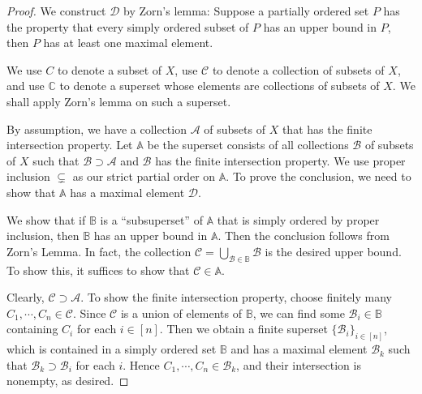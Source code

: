 \documentclass{article}
\numberwithin{equation}{section}
\theoremstyle{plain}
\theoremstyle{definition}
\begin{document}
\begin{proof}
We construct $\mathscr{D}$ by Zorn's lemma: Suppose a partially ordered set $P$ has the property that every simply ordered subset of $P$ has an upper bound in $P$, then $P$ has at least one maximal element.

We use $C$ to denote a subset of $X$, use $\mathscr{C}$ to denote a collection of subsets of $X$, and use $\mathbb{C}$ to denote a superset whose elements are collections of subsets of $X$. We shall apply Zorn's lemma on such a superset.

By assumption, we have a collection $\mathscr{A}$ of subsets of $X$ that has the finite intersection property. Let $\mathbb{A}$ be the superset consists of all collections $\mathscr{B}$ of subsets of $X$ such that $\mathscr{B}\supset\mathscr{A}$ and $\mathscr{B}$ has the finite intersection property. We use proper inclusion $\subsetneq$ as our strict partial order on $\mathbb{A}$. To prove the conclusion, we need to show that $\mathbb{A}$ has a maximal element $\mathscr{D}$.

We show that if $\mathbb{B}$ is a ``subsuperset'' of $\mathbb{A}$ that is simply ordered by proper inclusion, then $\mathbb{B}$ has an upper bound in $\mathbb{A}$. Then the conclusion follows from Zorn's Lemma. In fact, the collection $\mathscr{C}=\bigcup_{\mathscr{B}\in\mathbb{B}}\mathscr{B}$ is the desired upper bound. To show this, it suffices to show that $\mathscr{C}\in\mathbb{A}$.

Clearly, $\mathscr{C}\supset\mathscr{A}$. To show the finite intersection property, choose finitely many $C_1,\cdots,C_n\in\mathscr{C}$. Since $\mathscr{C}$ is a union of elements of $\mathbb{B}$, we can find some $\mathscr{B}_i\in\mathbb{B}$ containing $C_i$ for each $i\in[n]$. Then we obtain a finite superset $\{\mathscr{B}_i\}_{i\in[n]}$, which is contained in a simply ordered set $\mathbb{B}$ and has a maximal element $\mathscr{B}_k$ such that $\mathscr{B}_k\supset\mathscr{B}_i$ for each $i$. Hence $C_1,\cdots,C_n\in\mathscr{B}_k$, and their intersection is nonempty, as desired.
\end{proof}
\end{document}
